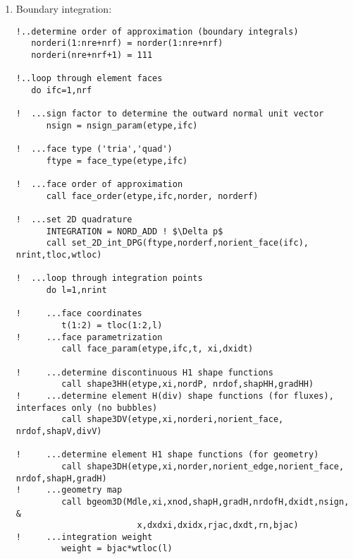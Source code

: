 \begin{enumerate}
{\begin{lstlisting}[mathescape,caption=\file{POISSON/PRIMAL\_DPG/}\routine{elem}: element integration]
!     ...2nd loop through enriched H1 test functions for Gram matrix
         do k2=k1,nrdofHH
!        ...Piola transformation
            q = shapHH(k2)
            dq(1:3) = gradHH(1,k2)*dxidx(1,1:3) + & 
                       gradHH(2,k2)*dxidx(2,1:3) + &
                       gradHH(3,k2)*dxidx(3,1:3)

!        ...determine index in triangular packed format
            k = (k2-1)*k2/2+k1
!
!        ...accumulate Gram with test inner product: $(v,v)_\test := (v,v) + (\nabla_h v, \nabla_h v)$
            aux = q*v + (dq(1)*dv(1) + dq(2)*dv(2) + dq(3)*dv(3))
            gramP(k) = gramP(k) + aux*weight
         enddo; enddo; enddo
\end{lstlisting}
	}
	\item{ Boundary integration:
\begin{lstlisting}[mathescape,caption=\file{POISSON/PRIMAL\_DPG/}\routine{elem}: boundary integration.]
!..determine order of approximation (boundary integrals)
   norderi(1:nre+nrf) = norder(1:nre+nrf)
   norderi(nre+nrf+1) = 111

!..loop through element faces
   do ifc=1,nrf

!  ...sign factor to determine the outward normal unit vector
      nsign = nsign_param(etype,ifc)

!  ...face type ('tria','quad')
      ftype = face_type(etype,ifc)

!  ...face order of approximation
      call face_order(etype,ifc,norder, norderf)

!  ...set 2D quadrature
      INTEGRATION = NORD_ADD ! $\Delta p$
      call set_2D_int_DPG(ftype,norderf,norient_face(ifc), nrint,tloc,wtloc)

!  ...loop through integration points
      do l=1,nrint

!     ...face coordinates
         t(1:2) = tloc(1:2,l)
!     ...face parametrization
         call face_param(etype,ifc,t, xi,dxidt)

!     ...determine discontinuous H1 shape functions
         call shape3HH(etype,xi,nordP, nrdof,shapHH,gradHH)
!     ...determine element H(div) shape functions (for fluxes), interfaces only (no bubbles)
         call shape3DV(etype,xi,norderi,norient_face, nrdof,shapV,divV)

!     ...determine element H1 shape functions (for geometry)
         call shape3DH(etype,xi,norder,norient_edge,norient_face, nrdof,shapH,gradH)
!     ...geometry map
         call bgeom3D(Mdle,xi,xnod,shapH,gradH,nrdofH,dxidt,nsign, &
                        x,dxdxi,dxidx,rjac,dxdt,rn,bjac)
!     ...integration weight
         weight = bjac*wtloc(l)


\end{lstlisting}}
\end{enumerate}

